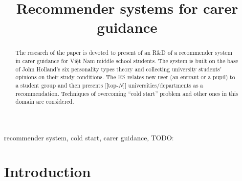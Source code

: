 \documentclass[conference,a4]{IEEEtran}
\begin{document}

\title{Recommender systems for carer guidance}

\author{%
}

\maketitle
\begin{abstract}
  The research of the paper is devoted to present of an R\&D of a recommender system in carer guidance for Việt Nam middle school students.  The system is built on the base of John Holland's six personality types theory and collecting university students' opinions on their study conditions.  The RS relates new user (an entrant or a pupil) to a student group and then presents [[top-$N$]] universities/departments as a recommendation.  Techniques of overcoming ``cold start'' problem and other ones in this domain are considered.

\end{abstract}

\begin{IEEEkeywords}
recommender system, cold start, carer guidance, TODO:
\end{IEEEkeywords}

\section{Introduction}
\end{document}

